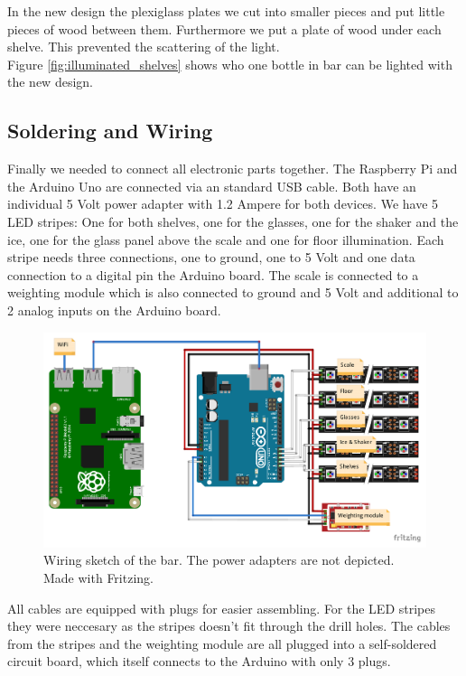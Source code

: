 \documentclass{acm_proc_article-sp}
\begin{document}
In the new design the plexiglass plates we cut into smaller pieces and put little pieces of wood between them. Furthermore we put a plate of wood under each shelve. This prevented the scattering of the light.\\
Figure \ref{fig:illuminated_shelves} shows who one bottle in bar can be lighted with the new design.

\subsection{Soldering and Wiring}
Finally we needed to connect all electronic parts together. The Raspberry Pi and the Arduino Uno are connected via an standard USB cable. Both have an individual 5 Volt power adapter with 1.2 Ampere for both devices. We have 5 LED stripes: One for both shelves, one for the glasses, one for the shaker and the ice, one for the glass panel above the scale and one for floor illumination. Each stripe needs three connections, one to ground, one to 5 Volt and one data connection to a digital pin the Arduino board. The scale is connected to a weighting module which is also connected to ground and 5 Volt and additional to 2 analog inputs on the Arduino board.

\begin{figure}[htbp] 
  \centering
     \includegraphics[width=1\linewidth]{pictures/sketch.pdf}
  \caption{Wiring sketch of the bar. The power adapters are not depicted. Made with Fritzing.}
  \label{fig:fritzing}
\end{figure}

All cables are equipped with plugs for easier assembling. For the LED stripes they were neccesary as the stripes doesn't fit through the drill holes. The cables from the stripes and the weighting module are all plugged into a self-soldered circuit board, which itself connects to the Arduino with only 3 plugs. 
\end{document}
